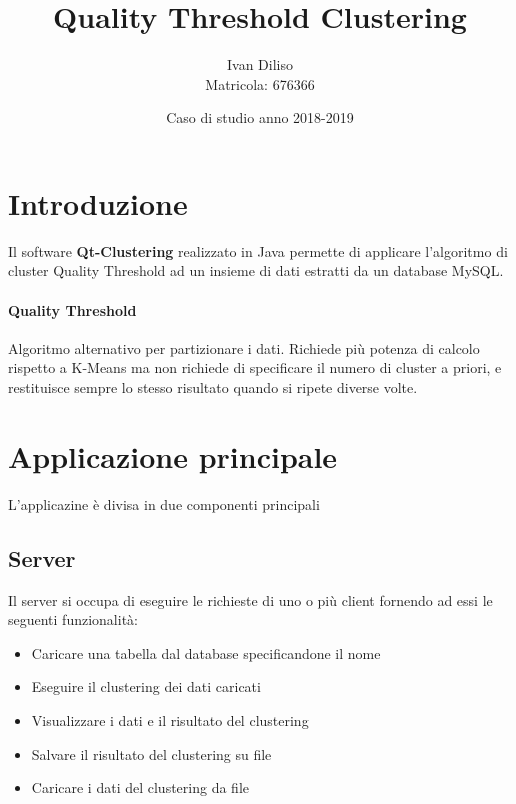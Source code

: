 \documentclass{article}
\title{Quality Threshold Clustering}
\date{Caso di studio anno 2018-2019}
\author{Ivan Diliso \\Matricola: 676366}
\begin{document}
    
    \maketitle
    \tableofcontents
    \newpage
    \section{Introduzione}
    Il software \textbf{Qt-Clustering} realizzato in Java permette di applicare 
    l'algoritmo di cluster Quality Threshold ad un insieme di dati estratti da 
    un database MySQL. 

    \paragraph{Quality Threshold} 
    Algoritmo alternativo per partizionare i dati. Richiede più potenza di
    calcolo rispetto a K-Means ma non richiede di specificare il numero di
    cluster a priori, e restituisce sempre lo stesso risultato quando si ripete
    diverse volte.
 
    \section{Applicazione principale}
    L'applicazine è divisa in due componenti principali
        \subsection{Server}
        Il server si occupa di eseguire le richieste di uno o più client
        fornendo ad essi le seguenti funzionalità:
            \begin{itemize}
                \item Caricare una tabella dal database specificandone il nome
                \item Eseguire il clustering dei dati caricati
                \item Visualizzare i dati e il risultato del clustering
                \item Salvare il risultato del clustering su file
                \item Caricare i dati del clustering da file
            \end{itemize}
        
        
\end{document}
